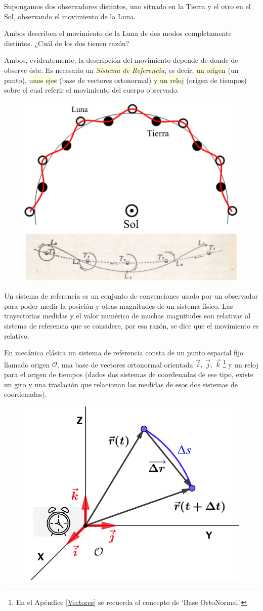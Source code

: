 \begin{multicols}{2}
Supongamos dos observadores distintos, uno situado en la Tierra y el otro en el Sol, observando el movimiento de la Luna.

Ambos describen el movimiento de la Luna de dos modos completamente distintos. ¿Cuál de los dos tienen razón?

Ambos, evidentemente, la descripción del movimiento depende de donde de observe éste. Es necesario un \colorbox{LightYellow}{\emph{Sistema de Referencia}}, es decir,  \colorbox{LightYellow}{un origen} (un punto),  \colorbox{LightYellow}{unos ejes} (base de vectores ortonormal)  \colorbox{LightYellow}{y un reloj} (origen de tiempos) sobre el cual referir el movimiento del cuerpo observado.
\begin{figure}[H]
		\centering
		\includegraphics[width=.5\textwidth]{imagenes/imagenes02/T02IM01.png}
	\end{figure}
\end{multicols}

Un sistema de referencia es un conjunto de convenciones usado por un observador para poder medir la posición y otras magnitudes de un sistema físico. Las trayectorias medidas y el valor numérico de muchas magnitudes son relativas al sistema de referencia que se considere, por esa razón, se dice que el movimiento es relativo.

\begin{multicols}{2}
En mecánica clásica un sistema de referencia consta de un punto espacial fijo llamado origen $\mathcal O$, una base de vectores ortonormal orientada $\vec i,\; \vec j,\; \vec k$ \footnote{En el Apéndice \ref{Vectores} se recuerda el concepto de `Base OrtoNormal'.}  y un reloj para el origen de tiempos (dados dos sistemas de coordenadas de ese tipo, existe un giro y una traslación que relacionan las medidas de esos dos sistemas de coordenadas).
\begin{figure}[H]
		\centering
		\includegraphics[width=.5\textwidth]{imagenes/imagenes02/T02IM02.png}
	\end{figure}
\end{multicols}

